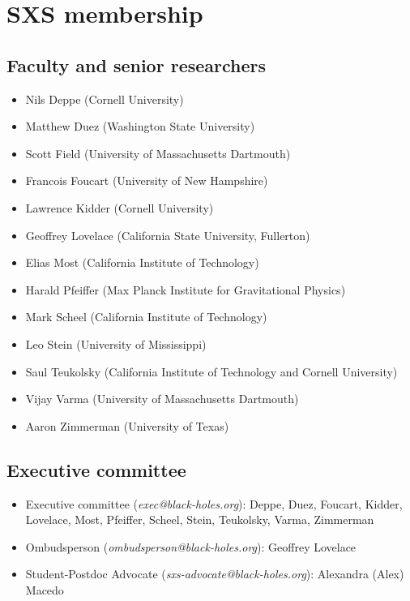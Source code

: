 \documentclass[12pt]{article}
\newcommand{\advocate}[0]{Alexandra (Alex) Macedo}
\newcommand{\ombudsperson}[0]{Geoffrey Lovelace}
\begin{document}
\section{SXS membership}
\subsection{Faculty and senior researchers}\label{sec:member_faculty}

\begin{itemize}
  \setlength\itemsep{-0.25em}
\item Nils Deppe (Cornell University)
\item Matthew Duez (Washington State University)
\item Scott Field (University of Massachusetts Dartmouth)
\item Francois Foucart (University of New Hampshire)
\item Lawrence Kidder (Cornell University)
\item Geoffrey Lovelace (California State University, Fullerton)
\item Elias Most (California Institute of Technology)
\item Harald Pfeiffer (Max Planck Institute for Gravitational Physics)
\item Mark Scheel (California Institute of Technology)
\item Leo Stein (University of Mississippi)
\item Saul Teukolsky (California Institute of Technology and Cornell University)
\item Vijay Varma (University of Massachusetts Dartmouth)
\item Aaron Zimmerman (University of Texas)
\end{itemize}

\subsection{Executive committee}\label{sec:executive_committee_members}
\begin{itemize}
  \setlength\itemsep{-0.25em}
\item Executive committee (\emph{exec@black-holes.org}): Deppe, Duez,
  Foucart, Kidder, Lovelace, Most, Pfeiffer, Scheel, Stein, Teukolsky,
  Varma, Zimmerman
\item Ombudsperson (\emph{ombudsperson@black-holes.org}): \ombudsperson{}
\item Student-Postdoc Advocate (\emph{sxs-advocate@black-holes.org}):
  \advocate{}
\end{itemize}
\end{document}

